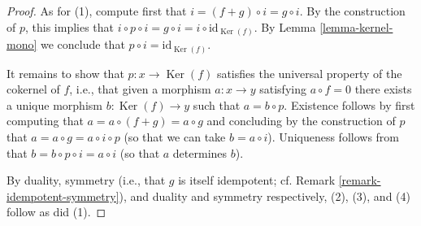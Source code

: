 \documentclass[10pt,a4paper]{amsart}
\theoremstyle{plain}
\theoremstyle{definition}
\theoremstyle{remark}
\numberwithin{equation}{subsection}
\def\Ker{\mathop{\mathrm{Ker}}}
\begin{document}
\begin{proof}
As for (1), compute first that $i = (f + g) \circ i = g \circ i$.
By the construction of $p$, this implies that
$i \circ p \circ i = g \circ i = i \circ \text{id} _ {\Ker (f)}$.
By Lemma \ref{lemma-kernel-mono} we conclude that
$p \circ i = \text{id} _ {\Ker (f)}$.

\medskip\noindent
It remains to show that $p : x \to \Ker (f)$
satisfies the universal property of the cokernel of $f$,
i.e., that given a morphism $a : x \to y$ satisfying $a \circ f = 0$
there exists a unique morphism $b : \Ker (f) \to y$
such that $a = b \circ p$.
Existence follows by first computing that $a = a \circ (f + g) = a \circ g$
and concluding by the construction of $p$
that $a = a \circ g = a \circ i \circ p$
(so that we can take $b = a \circ i$).
Uniqueness follows from that $b = b \circ p \circ i = a \circ i$
(so that $a$ determines $b$).

\medskip\noindent
By duality,
symmetry (i.e., that $g$ is itself idempotent;
cf. Remark \ref{remark-idempotent-symmetry}),
and duality and symmetry respectively, (2), (3), and (4) follow as did (1).
\end{proof}
\end{document}
